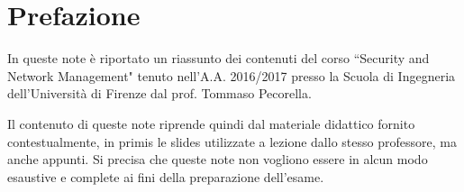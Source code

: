 \chapter*{Prefazione}
In queste note è riportato un riassunto dei contenuti del corso \textquotedblleft Security and Network Management" tenuto nell'A.A. 2016/2017 presso la Scuola di Ingegneria dell'Università di Firenze dal prof. Tommaso Pecorella.

Il contenuto di queste note riprende quindi dal materiale didattico fornito contestualmente, in primis le slides utilizzate a lezione dallo stesso professore, ma anche appunti. Si precisa che queste note non vogliono essere in alcun modo esaustive e complete ai fini della preparazione dell'esame.\\
